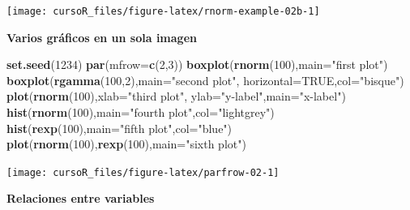 \documentclass[]{book}
\newenvironment{Shaded}{\begin{snugshade}}{\end{snugshade}}
\newcommand{\KeywordTok}[1]{\textcolor[rgb]{0.13,0.29,0.53}{\textbf{#1}}}
\newcommand{\DataTypeTok}[1]{\textcolor[rgb]{0.13,0.29,0.53}{#1}}
\newcommand{\DecValTok}[1]{\textcolor[rgb]{0.00,0.00,0.81}{#1}}
\newcommand{\StringTok}[1]{\textcolor[rgb]{0.31,0.60,0.02}{#1}}
\newcommand{\OtherTok}[1]{\textcolor[rgb]{0.56,0.35,0.01}{#1}}
\newcommand{\NormalTok}[1]{#1}
\begin{document}
\begin{center}\texttt{[image: cursoR\_files/figure-latex/rnorm-example-02b-1]} \end{center}

\textbf{Varios gráficos en un sola imagen}

\begin{Shaded}
\begin{Highlighting}[]
\KeywordTok{set.seed}\NormalTok{(}\DecValTok{1234}\NormalTok{)}
 \KeywordTok{par}\NormalTok{(}\DataTypeTok{mfrow=}\KeywordTok{c}\NormalTok{(}\DecValTok{2}\NormalTok{,}\DecValTok{3}\NormalTok{))}
 \KeywordTok{boxplot}\NormalTok{(}\KeywordTok{rnorm}\NormalTok{(}\DecValTok{100}\NormalTok{),}\DataTypeTok{main=}\StringTok{"first plot"}\NormalTok{)}
 \KeywordTok{boxplot}\NormalTok{(}\KeywordTok{rgamma}\NormalTok{(}\DecValTok{100}\NormalTok{,}\DecValTok{2}\NormalTok{),}\DataTypeTok{main=}\StringTok{"second plot"}\NormalTok{, }\DataTypeTok{horizontal=}\OtherTok{TRUE}\NormalTok{,}\DataTypeTok{col=}\StringTok{"bisque"}\NormalTok{)}
 \KeywordTok{plot}\NormalTok{(}\KeywordTok{rnorm}\NormalTok{(}\DecValTok{100}\NormalTok{),}\DataTypeTok{xlab=}\StringTok{"third plot"}\NormalTok{,}
      \DataTypeTok{ylab=}\StringTok{"y-label"}\NormalTok{,}\DataTypeTok{main=}\StringTok{"x-label"}\NormalTok{)}
 \KeywordTok{hist}\NormalTok{(}\KeywordTok{rnorm}\NormalTok{(}\DecValTok{100}\NormalTok{),}\DataTypeTok{main=}\StringTok{"fourth plot"}\NormalTok{,}\DataTypeTok{col=}\StringTok{"lightgrey"}\NormalTok{)}
 \KeywordTok{hist}\NormalTok{(}\KeywordTok{rexp}\NormalTok{(}\DecValTok{100}\NormalTok{),}\DataTypeTok{main=}\StringTok{"fifth plot"}\NormalTok{,}\DataTypeTok{col=}\StringTok{"blue"}\NormalTok{)}
 \KeywordTok{plot}\NormalTok{(}\KeywordTok{rnorm}\NormalTok{(}\DecValTok{100}\NormalTok{),}\KeywordTok{rexp}\NormalTok{(}\DecValTok{100}\NormalTok{),}\DataTypeTok{main=}\StringTok{"sixth plot"}\NormalTok{)}
\end{Highlighting}
\end{Shaded}

\begin{center}\texttt{[image: cursoR\_files/figure-latex/parfrow-02-1]} \end{center}

\textbf{Relaciones entre variables}
\end{document}
